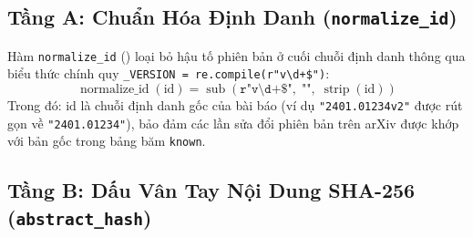 \subsection{Tầng A: Chuẩn Hóa Định Danh (\texttt{normalize\_id})}
\label{sec:ch2_dedup_id}

Hàm \texttt{normalize\_id} () loại bỏ hậu tố phiên bản ở cuối chuỗi định danh thông qua biểu thức chính quy \texttt{\_VERSION = re.compile(r"v\textbackslash d+\$")}:
\begin{equation}
  \operatorname{normalize\_id}(\text{id}) = \operatorname{sub}\!\left(\texttt{r"v\textbackslash d+\$"},\; \texttt{""},\; \operatorname{strip}(\text{id})\right)
  \label{eq:ch2_normalize_id}
\end{equation}
\noindent Trong đó: $\text{id}$ là chuỗi định danh gốc của bài báo (ví dụ \texttt{"2401.01234v2"} được rút gọn về \texttt{"2401.01234"}), bảo đảm các lần sửa đổi phiên bản trên arXiv được khớp với bản gốc trong bảng băm \texttt{known}.

\subsection{Tầng B: Dấu Vân Tay Nội Dung SHA-256 (\texttt{abstract\_hash})}
\label{sec:ch2_dedup_hash}

